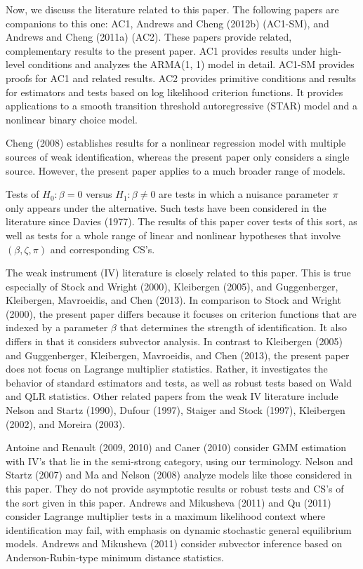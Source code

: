 \documentclass[12pt,titlepage,final,oneside,letterpaper]{article}
\begin{document}
Now, we discuss the literature related to this paper. The following papers
are companions to this one: AC1, Andrews and Cheng (2012b) (AC1-SM), and
Andrews and Cheng (2011a) (AC2). These papers provide related, complementary
results to the present paper. AC1 provides results under high-level
conditions and analyzes the ARMA(1, 1) model in detail. AC1-SM provides
proofs for AC1 and related results. AC2 provides primitive conditions and
results for estimators and tests based on log likelihood criterion
functions. It provides applications to a smooth transition threshold
autoregressive (STAR) model and a nonlinear binary choice model.

Cheng (2008) establishes results for a nonlinear regression model with
multiple sources of weak identification, whereas the present paper only
considers a single source. However, the present paper applies to a much
broader range of models.

Tests of $H_{0}:\beta =0$ versus $H_{1}:\beta \neq 0$ are tests in which a
nuisance parameter $\pi $ only appears under the alternative. Such tests
have been considered in the literature since Davies (1977). The results of
this paper cover tests of this sort, as well as tests for a whole range of
linear and nonlinear hypotheses that involve $(\beta ,\zeta ,\pi )$ and
corresponding CS's.

The weak instrument (IV) literature is closely related to this paper. This
is true especially of Stock and Wright (2000), Kleibergen (2005), and
Guggenberger, Kleibergen, Mavroeidis, and Chen (2013). In comparison to
Stock and Wright (2000), the present paper differs because it focuses on
criterion functions that are indexed by a parameter $\beta $ that determines
the strength of identification. It also differs in that it considers
subvector analysis. In contrast to Kleibergen (2005) and Guggenberger,
Kleibergen, Mavroeidis, and Chen (2013), the present paper does not focus on
Lagrange multiplier statistics. Rather, it investigates the behavior of
standard estimators and tests, as well as robust tests based on Wald and QLR
statistics. Other related papers from the weak IV literature include Nelson
and Startz (1990), Dufour (1997), Staiger and Stock (1997), Kleibergen
(2002), and Moreira (2003).

Antoine and Renault (2009, 2010) and Caner (2010) consider GMM estimation
with IV's that lie in the semi-strong category, using our terminology.
Nelson and Startz (2007) and Ma and Nelson (2008) analyze models like those
considered in this paper. They do not provide asymptotic results or robust
tests and CS's of the sort given in this paper. Andrews and Mikusheva (2011)
and Qu (2011) consider Lagrange multiplier tests in a maximum likelihood
context where identification may fail, with emphasis on dynamic stochastic
general equilibrium models. Andrews and Mikusheva (2011) consider subvector
inference based on Anderson-Rubin-type minimum distance statistics.
\end{document}

